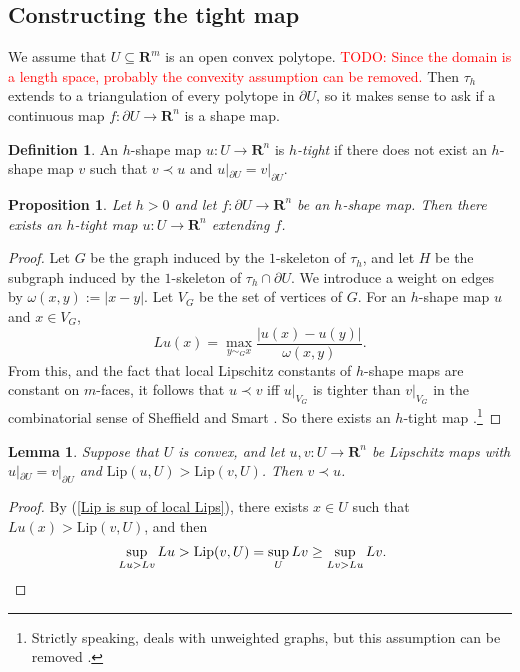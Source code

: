 \documentclass[reqno,11pt]{amsart}
\newcommand{\RR}{\mathbf{R}}
\newcommand{\Lip}{\mathrm{Lip}}
\newcommand{\dfn}[1]{\emph{#1}\index{#1}}
\newtheorem{lemma}[theorem]{Lemma}
\newtheorem{proposition}[theorem]{Proposition}
\theoremstyle{definition}
\newtheorem{definition}[theorem]{Definition}
\numberwithin{equation}{section}
\newcommand\todo[1]{\textcolor{red}{TODO: #1}}
\begin{document}
\subsection{Constructing the tight map}
We assume that $U \subseteq \RR^m$ is an open convex polytope.
\todo{Since the domain is a length space, probably the convexity assumption can be removed.}
Then $\tau_h$ extends to a triangulation of every polytope in $\partial U$, so it makes sense to ask if a continuous map $f: \partial U \to \RR^n$ is a shape map.

\begin{definition}
An $h$-shape map $u: U \to \RR^n$ is \dfn{$h$-tight} if there does not exist an $h$-shape map $v$ such that $v \prec u$ and $u|_{\partial U} = v|_{\partial U}$.
\end{definition}

\begin{proposition}\label{discrete wellposedness}
Let $h > 0$ and let $f: \partial U \to \RR^n$ be an $h$-shape map.
Then there exists an $h$-tight map $u: U \to \RR^n$ extending $f$.
\end{proposition}
\begin{proof}
Let $G$ be the graph induced by the $1$-skeleton of $\tau_h$, and let $H$ be the subgraph induced by the $1$-skeleton of $\tau_h \cap \partial U$.
We introduce a weight on edges by $\omega(x, y) := |x - y|$.
Let $V_G$ be the set of vertices of $G$.
For an $h$-shape map $u$ and $x \in V_G$,
$$Lu(x) = \max_{y \sim_G x} \frac{|u(x) - u(y)|}{\omega(x, y)}.$$
From this, and the fact that local Lipschitz constants of $h$-shape maps are constant on $m$-faces, it follows that $u \prec v$ iff $u|_{V_G}$ is tighter than $v|_{V_G}$ in the combinatorial sense of Sheffield and Smart \cite[\S1.2]{Sheffield12}.
So there exists an $h$-tight map \cite[Theorem 1.2]{Sheffield12}.\footnote{Strictly speaking, \cite{Sheffield12} deals with unweighted graphs, but this assumption can be removed \cite[Remark 2.2]{Sheffield12}.}
\end{proof}

\begin{lemma}\label{tight implies best lipschitz}
Suppose that $U$ is convex, and let $u, v: U \to \RR^n$ be Lipschitz maps with $u|_{\partial U} = v|_{\partial U}$ and $\Lip(u, U) > \Lip(v, U)$.
Then $v \prec u$.
\end{lemma}
\begin{proof}
By (\ref{Lip is sup of local Lips}), there exists $x \in U$ such that $Lu(x) > \Lip(v, U)$, and then
\begin{align*}
\sup_{Lu > Lv} Lu &> \Lip(v, U) = \sup_U Lv \geq \sup_{Lv > Lu} Lv. \qedhere
\end{align*}
\end{proof}
\end{document}
